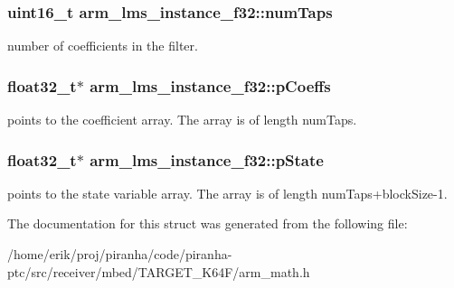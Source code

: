 \subsubsection[{\texorpdfstring{num\+Taps}{numTaps}}]{\setlength{\rightskip}{0pt plus 5cm}uint16\+\_\+t arm\+\_\+lms\+\_\+instance\+\_\+f32\+::num\+Taps}\hypertarget{structarm__lms__instance__f32_af73880d9009982f5d14529869494ec3d}{}\label{structarm__lms__instance__f32_af73880d9009982f5d14529869494ec3d}
number of coefficients in the filter. 
\subsubsection[{\texorpdfstring{p\+Coeffs}{pCoeffs}}]{\setlength{\rightskip}{0pt plus 5cm}float32\+\_\+t$\ast$ arm\+\_\+lms\+\_\+instance\+\_\+f32\+::p\+Coeffs}\hypertarget{structarm__lms__instance__f32_a4795c6f7d3f17cec15c2fd09f66edd1a}{}\label{structarm__lms__instance__f32_a4795c6f7d3f17cec15c2fd09f66edd1a}
points to the coefficient array. The array is of length num\+Taps. 
\subsubsection[{\texorpdfstring{p\+State}{pState}}]{\setlength{\rightskip}{0pt plus 5cm}float32\+\_\+t$\ast$ arm\+\_\+lms\+\_\+instance\+\_\+f32\+::p\+State}\hypertarget{structarm__lms__instance__f32_aaf94285be2f99b5b9af40bea8dcb14b9}{}\label{structarm__lms__instance__f32_aaf94285be2f99b5b9af40bea8dcb14b9}
points to the state variable array. The array is of length num\+Taps+block\+Size-\/1. 

The documentation for this struct was generated from the following file\+:\begin{DoxyCompactItemize}
\item 
/home/erik/proj/piranha/code/piranha-\/ptc/src/receiver/mbed/\+T\+A\+R\+G\+E\+T\+\_\+\+K64\+F/arm\+\_\+math.\+h\end{DoxyCompactItemize}
